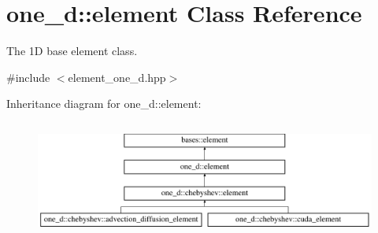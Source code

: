 \hypertarget{classone__d_1_1element}{\section{one\-\_\-d\-:\-:element Class Reference}
\label{classone__d_1_1element}
}


The 1\-D base element class.  




{\ttfamily \#include $<$element\-\_\-one\-\_\-d.\-hpp$>$}

Inheritance diagram for one\-\_\-d\-:\-:element\-:\begin{figure}[H]
\begin{center}
\leavevmode
\includegraphics[height=3.875432cm]{classone__d_1_1element}
\end{center}
\end{figure}
